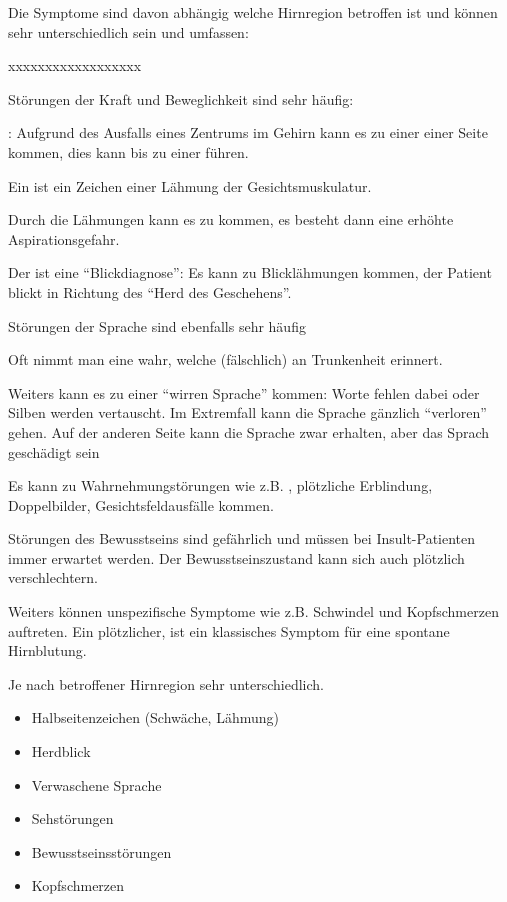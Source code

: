 {
Die Symptome sind davon abhängig welche Hirnregion betroffen ist und 
können sehr unterschiedlich sein und umfassen:

\begin{labeling}[~--]{xxxxxxxxxxxxxxxxxx}
  \item[Motorik] Störungen der Kraft und Beweglichkeit sind sehr häufig:
  
  : Aufgrund des Ausfalls eines Zentrums im
  Gehirn kann es zu einer  einer Seite kommen, dies kann bis
  zu einer  führen.
  
  Ein  ist ein Zeichen einer Lähmung
  der Gesichtsmuskulatur.
  
  Durch die Lähmungen kann es zu  kommen, es
  besteht dann eine erhöhte Aspirationsgefahr.
  
  Der  ist eine "`Blickdiagnose"': Es kann zu Blicklähmungen
  kommen, der Patient blickt in Richtung des "`Herd des Geschehens"'.
  
  \item[Sprache] Störungen der Sprache sind ebenfalls sehr
  häufig
  
  Oft nimmt man eine  wahr, welche (fälschlich) an
  Trunkenheit erinnert.
  
  Weiters kann es zu einer "`wirren Sprache"' kommen: Worte fehlen dabei oder
  Silben werden vertauscht. Im Extremfall kann die Sprache gänzlich "`verloren"'
  gehen. Auf der anderen Seite kann die Sprache zwar erhalten, aber das
  Sprach geschädigt sein
  
  \item[Wahrnehmung]
  Es kann zu Wahrnehmungstörungen wie z.B. , plötzliche
  Erblindung, Doppelbilder, Gesichtsfeldausfälle kommen.
  
  \item[Bewusstsein] Störungen des Bewusstseins sind gefährlich und müssen bei
  Insult-Patienten immer erwartet werden. Der Bewusstseinszustand kann sich
  auch plötzlich verschlechtern.
  
  \item[Allgemein] Weiters können unspezifische Symptome wie z.B.
  Schwindel und Kopfschmerzen auftreten.
  Ein plötzlicher,  ist ein klassisches
  Symptom für eine spontane Hirnblutung.
  
\end{labeling}
}
{
Je nach betroffener Hirnregion sehr unterschiedlich.
\begin{itemize}
  \item Halbseitenzeichen (Schwäche, Lähmung)
  \item Herdblick
  \item Verwaschene Sprache
  \item Sehstörungen
  \item Bewusstseinsstörungen
  \item Kopfschmerzen
\end{itemize}
}{}{}{}


